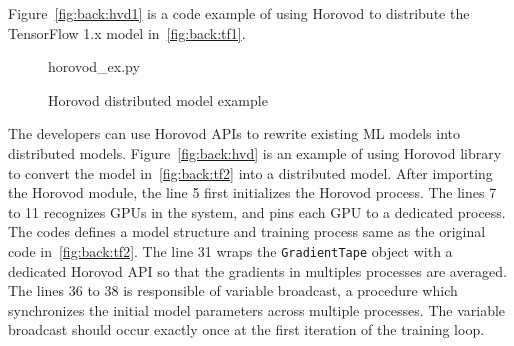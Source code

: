 Figure~\ref{fig:back:hvd1} is a code example of using Horovod to distribute
the TensorFlow 1.x model in~\ref{fig:back:tf1}.

\begin{figure}[ht!]
 
{horovod_ex.py}
  \caption{Horovod distributed model example}
\label{fig:back:hvd2} 
\end{figure}


The developers can use Horovod APIs to rewrite existing ML models into
distributed models.
Figure~\ref{fig:back:hvd} is an example of using Horovod library to convert
the model in~\ref{fig:back:tf2} into a distributed model.
After importing the Horovod module, the line 5 first initializes the
Horovod process. 
The lines 7 to 11 recognizes GPUs in the system, and pins each GPU to
a dedicated process.
The codes defines a model structure and training process same as the original
code in~\ref{fig:back:tf2}.
The line 31 wraps the {\tt GradientTape} object with a dedicated 
Horovod API so that the gradients in multiples processes are averaged.
The lines 36 to 38 is responsible of variable broadcast, a procedure which
synchronizes the initial model parameters across multiple processes.
The variable broadcast should occur exactly once at the first iteration of
the training loop.
